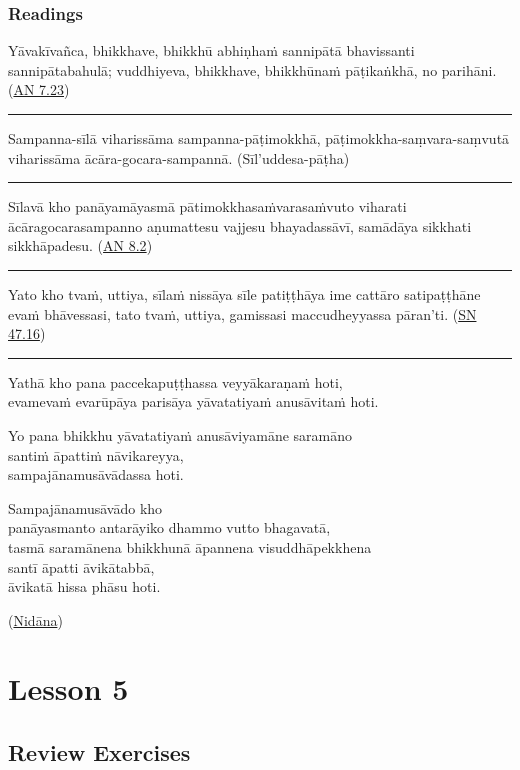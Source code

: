\documentclass[11pt,oneside]{memoir}
\begin{document}
\subsection{Readings}
\label{sec:org10ec49f}

Yāvakīvañca, bhikkhave, bhikkhū abhiṇhaṁ sannipātā bhavissanti sannipātabahulā;
vuddhiyeva, bhikkhave, bhikkhūnaṁ pāṭikaṅkhā, no parihāni. (\href{https://suttacentral.net/an7.23/pli/ms}{AN 7.23})

\noindent\rule{\textwidth}{0.5pt}

Sampanna-sīlā viharissāma sampanna-pāṭimokkhā, pāṭimokkha-saṃvara-saṃvutā
viharissāma ācāra-gocara-sampannā. (Sīl'uddesa-pāṭha)

\noindent\rule{\textwidth}{0.5pt}

Sīlavā kho panāyamāyasmā pātimokkhasaṁvarasaṁvuto viharati ācāragocarasampanno
aṇumattesu vajjesu bhayadassāvī, samādāya sikkhati sikkhāpadesu. (\href{https://suttacentral.net/an8.2/pli/ms}{AN 8.2})

\noindent\rule{\textwidth}{0.5pt}

Yato kho tvaṁ, uttiya, sīlaṁ nissāya sīle patiṭṭhāya ime cattāro satipaṭṭhāne
evaṁ bhāvessasi, tato tvaṁ, uttiya, gamissasi maccudheyyassa pāran'ti. (\href{https://suttacentral.net/sn47.16/pli/ms}{SN 47.16})

\noindent\rule{\textwidth}{0.5pt}

Yathā kho pana paccekapuṭṭhassa veyyākaraṇaṁ hoti, \\[0pt]
evamevaṁ evarūpāya parisāya yāvatatiyaṁ anusāvitaṁ hoti.

Yo pana bhikkhu yāvatatiyaṁ anusāviyamāne saramāno \\[0pt]
santiṁ āpattiṁ nāvikareyya, \\[0pt]
sampajānamusāvādassa hoti.

Sampajānamusāvādo kho \\[0pt]
panāyasmanto antarāyiko dhammo vutto bhagavatā, \\[0pt]
tasmā saramānena bhikkhunā āpannena visuddhāpekkhena \\[0pt]
santī āpatti āvikātabbā, \\[0pt]
āvikatā hissa phāsu hoti.

(\href{https://suttacentral.net/pli-tv-bu-pm/pli/ms}{Nidāna})
\chapter{Lesson 5}
\label{sec:org00c0056}
\section{Review Exercises}
\label{sec:orgddb835c}
\end{document}
